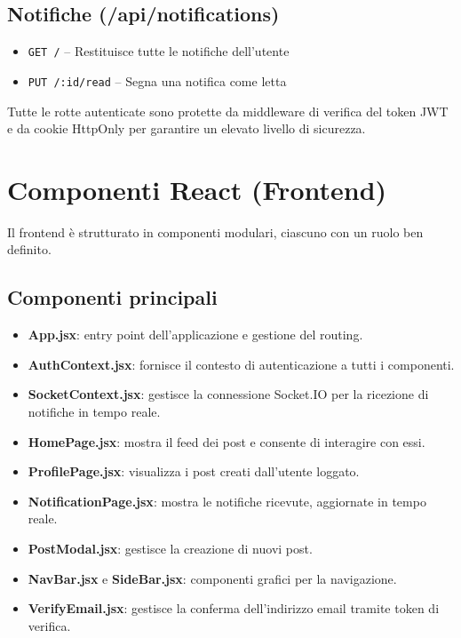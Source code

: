 \documentclass[a4paper,12pt]{article}
\begin{document}
\subsection{Notifiche (/api/notifications)}
\begin{itemize}
    \item \texttt{GET /} – Restituisce tutte le notifiche dell’utente
    \item \texttt{PUT /:id/read} – Segna una notifica come letta
\end{itemize}

Tutte le rotte autenticate sono protette da middleware di verifica del token JWT e da cookie HttpOnly per garantire un elevato livello di sicurezza.

\section{Componenti React (Frontend)}
Il frontend è strutturato in componenti modulari, ciascuno con un ruolo ben definito.

\subsection{Componenti principali}
\begin{itemize}
    \item \textbf{App.jsx}: entry point dell’applicazione e gestione del routing.
    \item \textbf{AuthContext.jsx}: fornisce il contesto di autenticazione a tutti i componenti.
    \item \textbf{SocketContext.jsx}: gestisce la connessione Socket.IO per la ricezione di notifiche in tempo reale.
    \item \textbf{HomePage.jsx}: mostra il feed dei post e consente di interagire con essi.
    \item \textbf{ProfilePage.jsx}: visualizza i post creati dall’utente loggato.
    \item \textbf{NotificationPage.jsx}: mostra le notifiche ricevute, aggiornate in tempo reale.
    \item \textbf{PostModal.jsx}: gestisce la creazione di nuovi post.
    \item \textbf{NavBar.jsx} e \textbf{SideBar.jsx}: componenti grafici per la navigazione.
    \item \textbf{VerifyEmail.jsx}: gestisce la conferma dell’indirizzo email tramite token di verifica.
\end{itemize}
\end{document}
